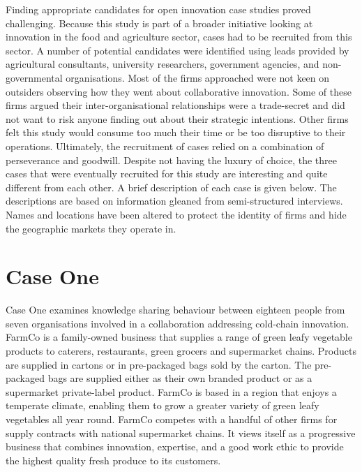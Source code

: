 
Finding appropriate candidates for open innovation case studies proved challenging. Because this study is part of a broader initiative looking at innovation in the food and agriculture sector, cases had to be recruited from this sector. A number of potential candidates were identified using leads provided by agricultural consultants, university researchers, government agencies, and non-governmental organisations. Most of the firms approached were not keen on outsiders observing how they went about collaborative innovation. Some of these firms argued their inter-organisational relationships were a trade-secret and did not want to risk anyone finding out about their strategic intentions. Other firms felt this study would consume too much their time or be too disruptive to their operations. Ultimately, the recruitment of cases relied on a combination of perseverance and goodwill. Despite not having the luxury of choice, the three cases that were eventually recruited for this study are interesting and quite different from each other. A brief description of each case is given below. The descriptions are based on information gleaned from semi-structured interviews. Names and locations have been altered to protect the identity of firms and hide the geographic markets they operate in. \medskip

\section{Case One}

Case One examines knowledge sharing behaviour between eighteen people from seven organisations involved in a collaboration addressing cold-chain innovation. FarmCo is a family-owned business that supplies a range of green leafy vegetable products to caterers, restaurants, green grocers and supermarket chains. Products are supplied in cartons or in pre-packaged bags sold by the carton. The pre-packaged bags are supplied either as their own branded product or as a supermarket private-label product. FarmCo is based in a region that enjoys a temperate climate, enabling them to grow a greater variety of green leafy vegetables all year round. FarmCo competes with a handful of other firms for supply contracts with national supermarket chains. It views itself as a progressive business that combines innovation, expertise, and a good work ethic to provide the highest quality fresh produce to its customers.\medskip

